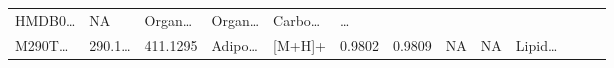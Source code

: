 \documentclass[
]{article}
\begin{document}
\begin{longtable}[]{@{}lllllllllllll@{}}
\begin{minipage}[t]{0.05\columnwidth}
HMDB0\ldots{}\strut
\end{minipage} & \begin{minipage}[t]{0.04\columnwidth}\raggedright
NA\strut
\end{minipage} & \begin{minipage}[t]{0.05\columnwidth}\raggedright
Organ\ldots{}\strut
\end{minipage} & \begin{minipage}[t]{0.05\columnwidth}\raggedright
Organ\ldots{}\strut
\end{minipage} & \begin{minipage}[t]{0.05\columnwidth}\raggedright
Carbo\ldots{}\strut
\end{minipage} & \begin{minipage}[t]{0.02\columnwidth}\raggedright
\ldots{}\strut
\end{minipage}\tabularnewline
\begin{minipage}[t]{0.05\columnwidth}\raggedright
M290T\ldots{}\strut
\end{minipage} & \begin{minipage}[t]{0.05\columnwidth}\raggedright
290.1\ldots{}\strut
\end{minipage} & \begin{minipage}[t]{0.05\columnwidth}\raggedright
411.1295\strut
\end{minipage} & \begin{minipage}[t]{0.05\columnwidth}\raggedright
Adipo\ldots{}\strut
\end{minipage} & \begin{minipage}[t]{0.05\columnwidth}\raggedright
{[}M+H{]}+\strut
\end{minipage} & \begin{minipage}[t]{0.07\columnwidth}\raggedright
0.9802\strut
\end{minipage} & \begin{minipage}[t]{0.07\columnwidth}\raggedright
0.9809\strut
\end{minipage} & \begin{minipage}[t]{0.05\columnwidth}\raggedright
NA\strut
\end{minipage} & \begin{minipage}[t]{0.04\columnwidth}\raggedright
NA\strut
\end{minipage} & \begin{minipage}[t]{0.05\columnwidth}\raggedright
Lipid\ldots{}\strut
\end{minipage} & \begin{minipage}[t]{0.05\columnwidth}\raggedright

\end{minipage}
\end{longtable}
\end{document}
